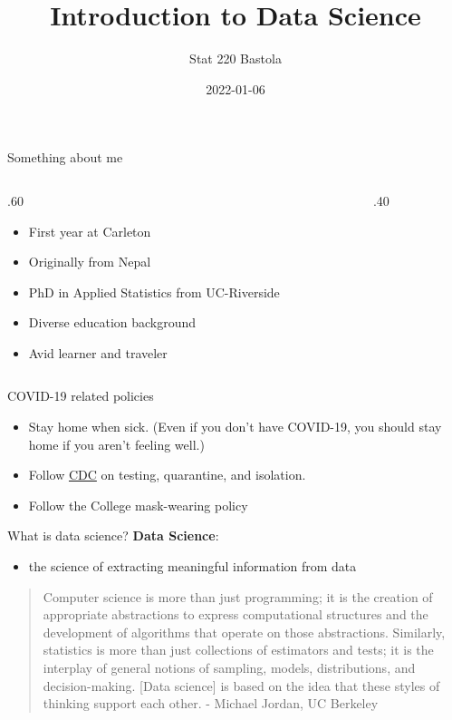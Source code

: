 \documentclass[
  10pt,
  ignorenonframetext,
]{beamer}
\title{Introduction to Data Science}
\author{Stat 220 Bastola}
\date{2022-01-06}
\providecommand{\tightlist}{%
  \setlength{\itemsep}{0pt}\setlength{\parskip}{0pt}}
\def\begincols{\begin{columns}}
\def\begincol{\begin{column}}
\def\endcol{\end{column}}
\def\endcols{\end{columns}}
\begin{document}
\frame{\titlepage}

\begin{frame}{Something about me}
\protect\hypertarget{something-about-me}{}
\begincols
  \begincol{.60\textwidth}
\begin{itemize}
    \item First year at Carleton
    \item Originally from Nepal
    \item PhD in Applied Statistics from UC-Riverside
    \item Diverse education background
    \item Avid learner and traveler
\end{itemize}

\endcol
\begincol{.40\textwidth}

\endcol \endcols
\end{frame}

\begin{frame}{COVID-19 related policies}
\protect\hypertarget{covid-19-related-policies}{}
\begin{itemize}
\item Stay home when sick. (Even if you don’t have COVID-19, you should stay home if you aren’t feeling well.)
\item Follow \href{https://www.cdc.gov/coronavirus/2019-ncov/vaccines/fully-vaccinated.html}{CDC} on testing, quarantine, and isolation.
\item Follow the College mask-wearing policy
\end{itemize}
\end{frame}

\begin{frame}{What is data science?}
\protect\hypertarget{what-is-data-science}{}
\textbf{Data Science}:

\begin{itemize}
\tightlist
\item
  the science of extracting meaningful information from data
\end{itemize}

\vspace*{0.7in}

\begin{quote}
Computer science is more than just programming; it is the creation of
appropriate abstractions to express computational structures and the
development of algorithms that operate on those abstractions. Similarly,
statistics is more than just collections of estimators and tests; it is
the interplay of general notions of sampling, models, distributions, and
decision-making. {[}Data science{]} is based on the idea that these
styles of thinking support each other. - Michael Jordan, UC Berkeley
\end{quote}
\end{frame}
\end{document}
